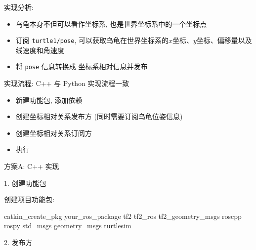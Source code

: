 \documentclass[openany, fontset=windowsold]{ctexbook}
\theoremstyle{kaiti}
\theoremstyle{normal}
\begin{document}
实现分析:

\begin{itemize}
  \item 乌龟本身不但可以看作坐标系, 也是世界坐标系中的一个坐标点
  \item 订阅 \verb|turtle1/pose|, 可以获取乌龟在世界坐标系的$x$坐标、$y$坐标、偏移量以及线速度和角速度
  \item 将 \verb|pose| 信息转换成 坐标系相对信息并发布
\end{itemize}

实现流程: C++ 与 Python 实现流程一致

\begin{itemize}
  \item 新建功能包, 添加依赖
  \item 创建坐标相对关系发布方 (同时需要订阅乌龟位姿信息)
  \item 创建坐标相对关系订阅方
  \item 执行
\end{itemize}

方案A: C++ 实现

1. 创建功能包

创建项目功能包:

\begin{bash}
  catkin_create_pkg your_ros_package tf2 tf2_ros tf2_geometry_msgs roscpp rospy std_msgs geometry_msgs turtlesim
\end{bash}

2. 发布方
\end{document}
